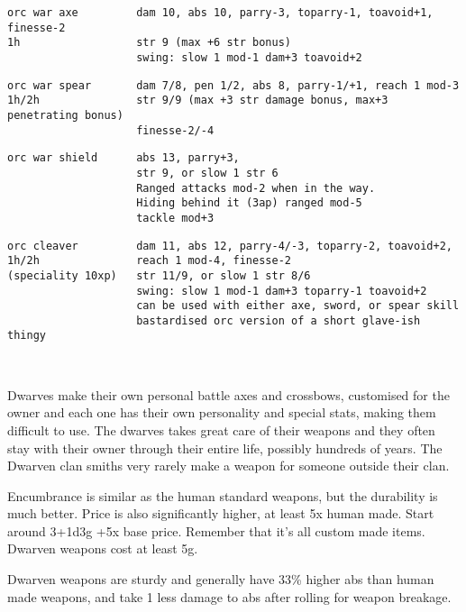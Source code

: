 \small \begin{samepage} \begin{verbatim}
orc war axe         dam 10, abs 10, parry-3, toparry-1, toavoid+1, finesse-2
1h                  str 9 (max +6 str bonus)
                    swing: slow 1 mod-1 dam+3 toavoid+2
\end{verbatim} \blocklistgap \begin{verbatim}
orc war spear       dam 7/8, pen 1/2, abs 8, parry-1/+1, reach 1 mod-3
1h/2h               str 9/9 (max +3 str damage bonus, max+3 penetrating bonus)
                    finesse-2/-4
\end{verbatim} \blocklistgap \begin{verbatim}
orc war shield      abs 13, parry+3,
                    str 9, or slow 1 str 6
                    Ranged attacks mod-2 when in the way.
                    Hiding behind it (3ap) ranged mod-5
                    tackle mod+3
\end{verbatim} \blocklistgap \begin{verbatim}
orc cleaver         dam 11, abs 12, parry-4/-3, toparry-2, toavoid+2,
1h/2h               reach 1 mod-4, finesse-2
(speciality 10xp)   str 11/9, or slow 1 str 8/6
                    swing: slow 1 mod-1 dam+3 toparry-1 toavoid+2
                    can be used with either axe, sword, or spear skill
                    bastardised orc version of a short glave-ish thingy
\end{verbatim} \end{samepage} \normalsize \goodbreak

\


\goodbreak
\noindent Dwarves make their own personal battle axes and crossbows, customised for the owner and each one has their own personality and special stats, making them difficult to use. The dwarves takes great care of their weapons and they often stay with their owner through their entire life, possibly hundreds of years. The Dwarven clan smiths very rarely make a weapon for someone outside their clan.

Encumbrance is similar as the human standard weapons, but the durability is much better. Price is also significantly higher, at least 5x human made. Start around 3+1d3g +5x base price. Remember that it's all custom made items. Dwarven weapons cost at least 5g.

Dwarven weapons are sturdy and generally have 33\% higher abs than human made weapons, and take 1 less damage to abs after rolling for weapon breakage.

